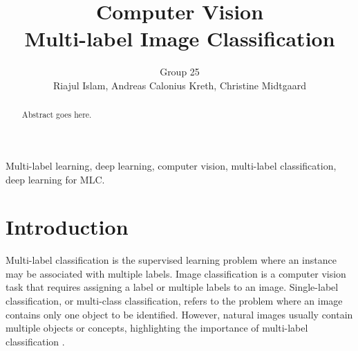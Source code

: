 \documentclass[lettersize,journal]{IEEEtran}
\begin{document}
\title{Computer Vision\\ \vspace{.5em} 
\Large Multi-label Image Classification}
\author{Group 25 \\ \vspace{.2em} Riajul Islam, Andreas Calonius Kreth, Christine Midtgaard}



\maketitle







\begin{abstract}
Abstract goes here.
\end{abstract}

\begin{IEEEkeywords}
Multi-label learning, deep learning, computer vision, multi-label
classification, deep learning for MLC. 

\end{IEEEkeywords}


\section{Introduction}






Multi-label classification is the supervised learning problem where an instance may be associated with multiple labels. Image classification is a computer vision task that requires assigning a label or multiple labels to an image. Single-label classification, or multi-class classification, refers to the problem where an image contains only one object to be identified. However, natural images usually contain multiple objects or concepts, highlighting the importance of multi-label classification \cite{ridnik2021mldecoderscalableversatileclassification}. 
\end{document}
